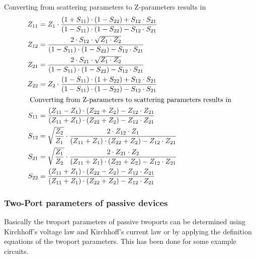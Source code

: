 Converting from scattering parameters to Z-parameters results in
\begin{align}
Z_{11} &= Z_{1}\cdot \dfrac{\left(1 + S_{11}\right)\cdot \left(1 - S_{22}\right) + S_{12}\cdot S_{21}}{\left(1 - S_{11}\right)\cdot \left(1 - S_{22}\right) - S_{12}\cdot S_{21}}\\
Z_{12} &= \dfrac{2\cdot S_{12}\cdot \sqrt{Z_{1}\cdot Z_{2}}}{\left(1 - S_{11}\right)\cdot \left(1 - S_{22}\right) - S_{12}\cdot S_{21}}\\
Z_{21} &= \dfrac{2\cdot S_{21}\cdot \sqrt{Z_{1}\cdot Z_{2}}}{\left(1 - S_{11}\right)\cdot \left(1 - S_{22}\right) - S_{12}\cdot S_{21}}\\
Z_{22} &= Z_{2}\cdot \dfrac{\left(1 - S_{11}\right)\cdot \left(1 + S_{22}\right) + S_{12}\cdot S_{21}}{\left(1 - S_{11}\right)\cdot \left(1 - S_{22}\right) - S_{12}\cdot S_{21}}\\
\intertext{
Converting from Z-parameters to scattering parameters results in
}
S_{11} &= \dfrac{\left(Z_{11} - Z_{1}\right)\cdot \left(Z_{22} + Z_{2}\right) - Z_{12}\cdot Z_{21}}{\left(Z_{11} + Z_{1}\right)\cdot \left(Z_{22} + Z_{2}\right) - Z_{12}\cdot Z_{21}}\\
S_{12} &= \sqrt{\dfrac{Z_2}{Z_1}}\cdot \dfrac{2\cdot Z_{12}\cdot Z_{1}}{\left(Z_{11} + Z_{1}\right)\cdot \left(Z_{22} + Z_{2}\right) - Z_{12}\cdot Z_{21}}\\
S_{21} &= \sqrt{\dfrac{Z_1}{Z_2}}\cdot \dfrac{2\cdot Z_{21}\cdot Z_{2}}{\left(Z_{11} + Z_{1}\right)\cdot \left(Z_{22} + Z_{2}\right) - Z_{12}\cdot Z_{21}}\\
S_{22} &= \dfrac{\left(Z_{11} + Z_{1}\right)\cdot \left(Z_{22} - Z_{2}\right) - Z_{12}\cdot Z_{21}}{\left(Z_{11} + Z_{1}\right)\cdot \left(Z_{22} + Z_{2}\right) - Z_{12}\cdot Z_{21}}
\end{align}


\subsubsection{Two-Port parameters of passive devices}

Basically the twoport parameters of passive twoports can be determined
using Kirchhoff's voltage law and Kirchhoff's current law or by
applying the definition equations of the twoport parameters.  This has
been done \cite{Weissgerber} for some example circuits.

